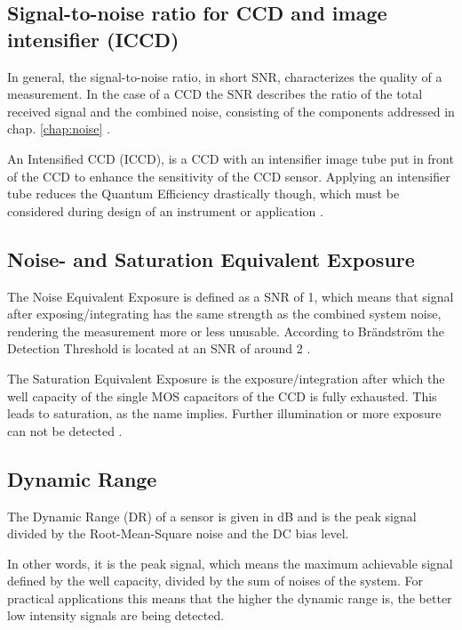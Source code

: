 \subsection{Signal-to-noise ratio for CCD and image intensifier (ICCD)}
In general, the signal-to-noise ratio, in short SNR, characterizes the quality of a measurement. In the case of a CCD the SNR describes the ratio of the total received signal and the combined noise, consisting of the components addressed in chap. \ref{chap:noise} \citep{noiseFSU}. \par
An Intensified CCD (ICCD), is a CCD with an intensifier image tube put in front of the CCD to enhance the sensitivity of the CCD sensor. Applying an intensifier tube reduces the Quantum Efficiency drastically though, which must be considered during design of an instrument or application \citep{hoymorksensors}.

\subsection{Noise- and Saturation Equivalent Exposure}
The Noise Equivalent Exposure is defined as a SNR of 1, which means that signal after exposing/integrating has the same strength as the combined system noise, rendering the measurement more or less unusable. According to Brändström the Detection Threshold is located at an SNR of around 2 \citep[c.f.][chap. 3.1.10]{brandstrom2003auroral}.

The Saturation Equivalent Exposure is the exposure/integration after which the well capacity of the single MOS capacitors of the CCD is fully exhausted. This leads to saturation, as the name implies. Further illumination or more exposure can not be detected \citep{brandstrom2003auroral}.

\subsection{Dynamic Range}
The Dynamic Range (DR) of a sensor is given in dB and is the peak signal divided by the Root-Mean-Square noise and the DC bias level.

In other words, it is the peak signal, which means the maximum achievable signal defined by the well capacity, divided by the sum of noises of the system. For practical applications this means that the higher the dynamic range is, the better low intensity signals are being detected.


